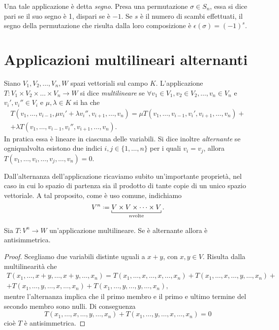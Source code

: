 Una tale applicazione è detta \emph{segno}.
Presa una permutazione $\sigma\in S_n$, essa si dice pari se il suo segno è 1, dispari se è $-1$.
Se $s$ è il numero di scambi effettuati, il segno della permutazione che risulta dalla loro composizione è $\epsilon(\sigma)=(-1)^s$.

\section{Applicazioni multilineari alternanti}
\begin{definizione} \label{d:applicazione-multilineare-alternante}
	Siano $V_1,V_2,\dots,V_n,W$ spazi vettoriali sul campo $K$.
	L'applicazione $T\colon V_1\times V_2\times\dots\times V_n\to W$ si dice \emph{multilineare} se $\forall v_1\in V_1,v_2\in V_2,\dots,v_n\in V_n$ e $v_i',v_i''\in V_i$ e $\mu,\lambda\in K$ si ha che
	\begin{multline*}
		T(v_1,\dots,v_{i-1},\mu v_i'+\lambda v_i'',v_{i+1},\dots,v_n)=\mu T(v_1,\dots,v_{i-1},v_i',v_{i+1},\dots,v_n)+\\+\lambda T(v_1,\dots,v_{i-1},v_i'',v_{i+1},\dots,v_n).
	\end{multline*}
	In pratica essa è lineare in ciascuna delle variabili.
	Si dice inoltre \emph{alternante} se ogniqualvolta esistono due indici $i,j\in\{1,\dots,n\}$ per i quali $v_i=v_j$, allora $T(v_1,\dots,v_i,\dots,v_j,\dots,v_n)=0$.
\end{definizione}
Dall'alternanza dell'applicazione ricaviamo subito un'importante proprietà, nel caso in cui lo spazio di partenza sia il prodotto di tante copie di un unico spazio vettoriale.
A tal proposito, come è uso comune, indichiamo
\begin{equation}
	V^n\defeq\underbracket[.5pt]{V\times V\times\cdots\times V}_{n\text{volte}}.
\end{equation}
\begin{teorema} \label{t:alternante-implica-antisimmetrica}
	Sia $T\colon V^n\to W$ un'applicazione multilineare.
	Se è alternante allora è antisimmetrica.
\end{teorema}
\begin{proof}
	Scegliamo due variabili distinte uguali a $x+y$, con $x,y\in V$.
	Risulta dalla multilinearità che
	\begin{multline}
		T(x_1,\dots,x+y,\dots,x+y,\dots,x_n)=T(x_1,\dots,x,\dots,x,\dots,x_n)+T(x_1,\dots,x,\dots,y,\dots,x_n)+\\+T(x_1,\dots,y,\dots,x,\dots,x_n)+T(x_1,\dots,y,\dots,y,\dots,x_n),
	\end{multline}
	mentre l'alternanza implica che il primo membro e il primo e ultimo termine del secondo membro sono nulli.
	Di conseguenza
	\begin{equation}
		T(x_1,\dots,x,\dots,y,\dots,x_n)+T(x_1,\dots,y,\dots,x,\dots,x_n)=0
	\end{equation}
	cioè $T$ è antisimmetrica.
\end{proof}

